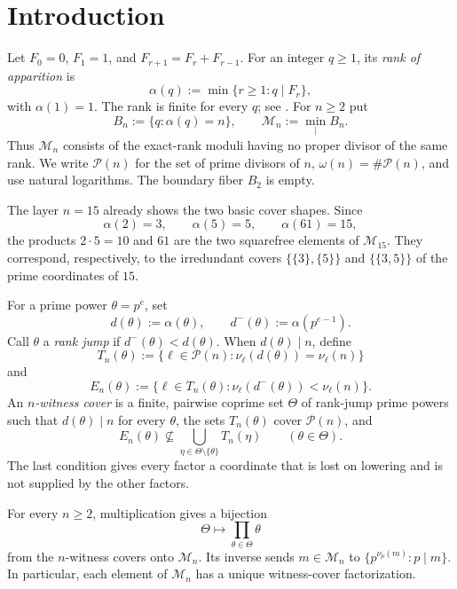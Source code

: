 \section{Introduction}\label{sec:intro}

Let $F_0=0$, $F_1=1$, and $F_{r+1}=F_r+F_{r-1}$.  For an integer
$q\geq1$, its \emph{rank of apparition} is
\[
 \alpha(q):=\min\{r\geq1:q\mid F_r\},
\]
with $\alpha(1)=1$.  The rank is finite for every $q$; see
\cite{Wall1960FibonacciModm,Vinson1963RankApparition}.  For $n\geq2$ put
\[
 B_n:=\{q:\alpha(q)=n\},\qquad
 \mathcal M_n:=\min_{\mid}B_n.
\]
Thus $\mathcal M_n$ consists of the exact-rank moduli having no proper
divisor of the same rank.  We write $\mathcal P(n)$ for the set of prime
divisors of $n$, $\omega(n)=\#\mathcal P(n)$, and use natural logarithms.
The boundary fiber $B_2$ is empty.

The layer $n=15$ already shows the two basic cover shapes.  Since
\[
 \alpha(2)=3,\qquad \alpha(5)=5,\qquad \alpha(61)=15,
\]
the products $2\cdot5=10$ and $61$ are the two squarefree elements of
$\mathcal M_{15}$.  They correspond, respectively, to the irredundant covers
$\{\{3\},\{5\}\}$ and $\{\{3,5\}\}$ of the prime coordinates of $15$.

For a prime power $\theta=p^e$, set
\[
 d(\theta):=\alpha(\theta),\qquad
 d^-(\theta):=\alpha(p^{e-1}).
\]
Call $\theta$ a \emph{rank jump} if $d^-(\theta)<d(\theta)$.  When
$d(\theta)\mid n$, define
\[
 T_n(\theta):=\{\ell\in\mathcal P(n):
 \nu_\ell(d(\theta))=\nu_\ell(n)\}
\]
and
\[
 E_n(\theta):=\{\ell\in T_n(\theta):
 \nu_\ell(d^-(\theta))<\nu_\ell(n)\}.
\]
An \emph{$n$-witness cover} is a finite, pairwise coprime set $\Theta$ of
rank-jump prime powers such that $d(\theta)\mid n$ for every $\theta$, the
sets $T_n(\theta)$ cover $\mathcal P(n)$, and
\[
 E_n(\theta)\nsubseteq
 \bigcup_{\eta\in\Theta\setminus\{\theta\}}T_n(\eta)
 \qquad(\theta\in\Theta).
\]
The last condition gives every factor a coordinate that is lost on lowering
and is not supplied by the other factors.

\begin{theorem}\label{thm:witness-classification}
For every $n\geq2$, multiplication gives a bijection
\[
 \Theta\longmapsto\prod_{\theta\in\Theta}\theta
\]
from the $n$-witness covers onto $\mathcal M_n$.  Its inverse sends
$m\in\mathcal M_n$ to
$\{p^{\nu_p(m)}:p\mid m\}$.  In particular, each element of
$\mathcal M_n$ has a unique witness-cover factorization.
\end{theorem}

